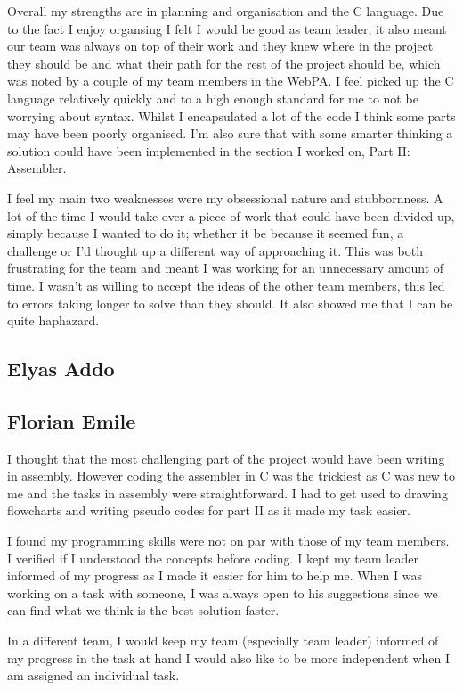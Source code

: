 \documentclass[11pt]{article}
\begin{document}
Overall my strengths are in planning and organisation and the C language. Due to the fact I enjoy organsing I felt I would be good as team leader, it also meant our team was always on top of their work and they knew where in the project they should be and what their path for the rest of the project should be, which was noted by a couple of my team members in the WebPA. I feel picked up the C language relatively quickly and to a high enough standard for me to not be worrying about syntax. Whilst I encapsulated a lot of the code I think some parts may have been poorly organised. I'm also sure that with some smarter thinking a  solution could have been implemented in the section I worked on, Part II: Assembler. \newline

I feel my main two weaknesses were my obsessional nature and stubbornness.
A lot of the time I would take over a piece of work that could have been divided up, simply because I wanted to do it; whether it be because it seemed fun, a challenge or I'd thought up a different way of approaching it. This was both frustrating for the team and meant I was working for an unnecessary amount of time. I wasn't as willing to accept the ideas of the other team members, this led to errors taking longer to solve than they should. It also showed me that I can be quite haphazard.

\subsection{Elyas Addo}
\subsection{Florian Emile}
I thought that the most challenging part of the project would have been writing
in assembly. However coding the assembler in C was the trickiest as C was new to
me and the tasks in assembly were straightforward. I had to get used to drawing
flowcharts and writing pseudo codes for part II as it made my task easier.

I found my programming skills were not on par with those of my team members. I
verified if I understood the concepts before coding. I kept my team leader
informed of my progress as I made it easier for him to help me. When I was
working on a task with someone, I was always open to his suggestions since we
can find what we think is the best solution faster.

In a different team, I would keep my team (especially team leader) informed of
my progress in the task at hand I would also like to be more independent when I
am assigned an individual task.
\end{document}
